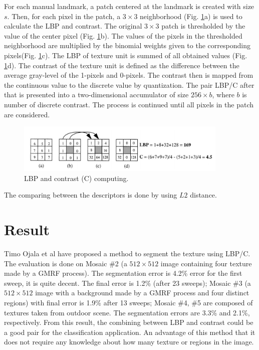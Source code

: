 \documentclass[12pt,a4paper]{article}
\begin{document}
For each manual landmark, a patch centered at the landmark is created  with size $s$. Then, for each pixel in the patch, a $3 \times 3$ neighborhood (Fig. \ref{figlbpc}a) is used to calculate the LBP and contrast. The original $3 \times 3$ patch is thresholded by the value of the center pixel (Fig. \ref{figlbpc}b). The values of the pixels in the thresholded neighborhood are multiplied by the binomial weights given to the corresponding pixels(Fig. \ref{figlbpc}c). The LBP of texture unit is summed of all obtained values (Fig. \ref{figlbpc}d). The contrast of the texture unit is defined as the difference between the average gray-level of the 1-pixels and 0-pixels. The contrast then is mapped from the continuous value to the discrete value by quantization. The pair LBP/C after that is presented into a two-dimensional accumulator of size $256 \times b$, where $b$ is number of discrete contrast. The process is continued until all pixels in the patch are considered.\\
\begin{figure}[htb]
    \centering
    \includegraphics[width=0.9\textwidth]{./images/lbpc}
    \caption{LBP and contrast (C) computing.}
    \label{figlbpc}
\end{figure}
The comparing between the descriptors is done by using $L2$ distance.
\section{Result}
Timo Ojala et al \cite{ojala1999unsupervised} have proposed a method to segment the texture using LBP/C. The evaluation is done on Mosaic \#2 (a $512 \times 512$ image containing four texture made by a GMRF process). The segmentation error is 4.2\% error for the first sweep, it is quite decent. The final error is 1.2\% (after 23 sweeps); Mosaic \#3 (a $512 \times 512$ image with a background made by a GMRF process and four distinct regions) with final error is 1.9\% after 13 sweeps; Mosaic \#4, \#5 are composed of textures taken from outdoor scene. The segmentation errors are 3.3\% and 2.1\%, respectively. From this result, the combining between LBP and contrast could be a good pair for the classification application. An advantage of this method that it does not require any knowledge about how many texture or regions in the image.
\end{document}
